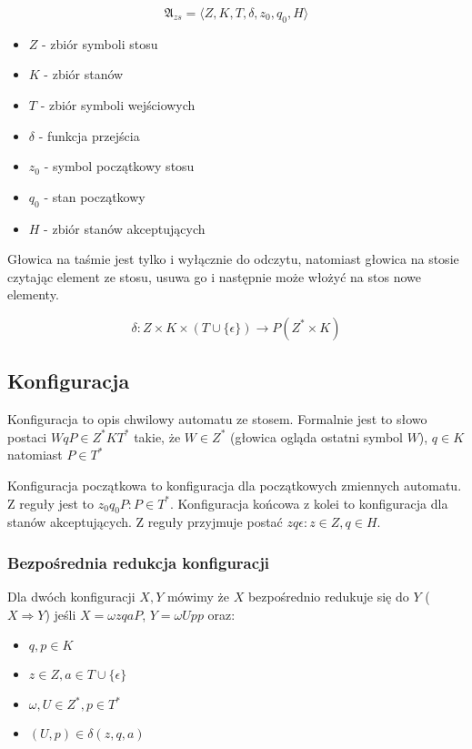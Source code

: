 \documentclass{../notatki}
\begin{document}
$$
\mathfrak{A}_{zs} = \langle Z, K, T, \delta, z_0, q_0, H \rangle
$$

\begin{itemize}
  \item $Z$ - zbiór symboli stosu
  \item $K$ - zbiór stanów
  \item $T$ - zbiór symboli wejściowych
  \item $\delta$ - funkcja przejścia
  \item $z_0$ - symbol początkowy stosu
  \item $q_0$ - stan początkowy
  \item $H$ - zbiór stanów akceptujących
\end{itemize}

Głowica na taśmie jest tylko i wyłącznie do odczytu, natomiast głowica na stosie
czytając element ze stosu, usuwa go i następnie może włożyć na stos nowe
elementy.

$$
\delta: Z \times K \times (T \cup \{\epsilon\}) \rightarrow P(Z^* \times K)
$$

\subsection{Konfiguracja}

Konfiguracja to opis chwilowy automatu ze stosem. Formalnie jest to słowo
postaci $WqP \in Z^*KT^*$ takie, że $W \in Z^*$ (głowica ogląda ostatni symbol
$W$), $q \in K$ natomiast $P \in T^*$

Konfiguracja początkowa to konfiguracja dla początkowych zmiennych automatu.
Z reguły jest to $z_0q_0P : P \in T^*$. Konfiguracja końcowa z kolei to
konfiguracja dla stanów akceptujących. Z reguły przyjmuje postać $z
q\epsilon : z \in Z, q \in H$.

\subsubsection{Bezpośrednia redukcja konfiguracji}

Dla dwóch konfiguracji $X, Y$ mówimy że $X$ bezpośrednio redukuje się do $Y$
($X \Rightarrow Y$) jeśli $X=\omega zqaP$, $Y=\omega Upp$ oraz:

\begin{itemize}
  \item $q,p \in K$
  \item $z \in Z, a \in T \cup \{\epsilon\}$
  \item $\omega, U \in Z^*, p \in T^*$
  \item $(U, p) \in \delta(z, q, a)$
\end{itemize}
\end{document}
